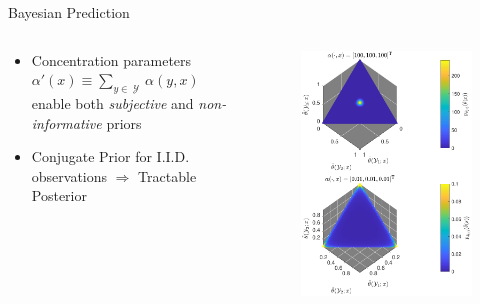 \documentclass[final]{beamer}
\DeclareMathOperator{\Ycal}{\mathcal{Y}}
\begin{document}
\begin{frame}{}
\begin{columns}[T]
\begin{column}{.34\linewidth}
\begin{block}{Bayesian Prediction}
\begin{columns}[c]
\begin{column}{.49\linewidth}
\begin{itemize}
\item Concentration parameters $\alpha'(x) \equiv \sum_{y \in \Ycal} \alpha(y,x)$ enable both \emph{subjective} and \emph{non-informative} priors
\item Conjugate Prior for I.I.D. observations $\Rightarrow$ Tractable Posterior
\end{itemize}



\end{column}
\begin{column}{.44\linewidth}


\begin{figure}
\centering
\includegraphics[width=0.9\linewidth]{P_theta_tilde.pdf}
\end{figure}

\end{column}
\end{columns}




\end{block}
\end{column}
\end{columns}
\end{frame}
\end{document}
